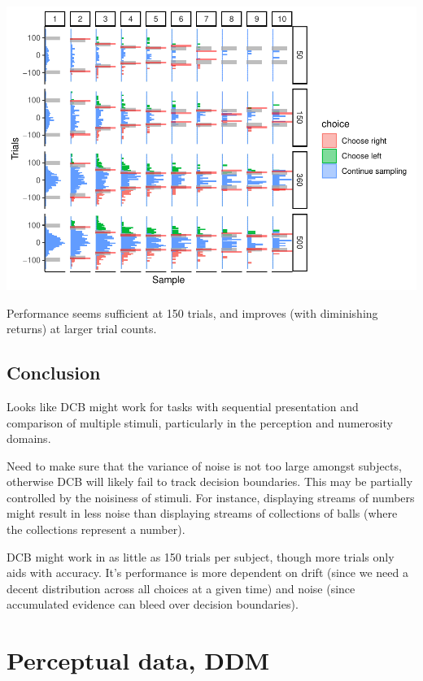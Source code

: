 \documentclass[
]{book}
\begin{document}
\includegraphics{LateNightBayes_files/figure-latex/unnamed-chunk-15-1.pdf}

Performance seems sufficient at 150 trials, and improves (with diminishing returns) at larger trial counts.

\hypertarget{conclusion}{%
\subsection{Conclusion}\label{conclusion}}

Looks like DCB might work for tasks with sequential presentation and comparison of multiple stimuli, particularly in the perception and numerosity domains.

Need to make sure that the variance of noise is not too large amongst subjects, otherwise DCB will likely fail to track decision boundaries. This may be partially controlled by the noisiness of stimuli. For instance, displaying streams of numbers might result in less noise than displaying streams of collections of balls (where the collections represent a number).

DCB might work in as little as 150 trials per subject, though more trials only aids with accuracy. It's performance is more dependent on drift (since we need a decent distribution across all choices at a given time) and noise (since accumulated evidence can bleed over decision boundaries).

\hypertarget{perceptual-data-ddm}{%
\section{Perceptual data, DDM}\label{perceptual-data-ddm}}
\end{document}
